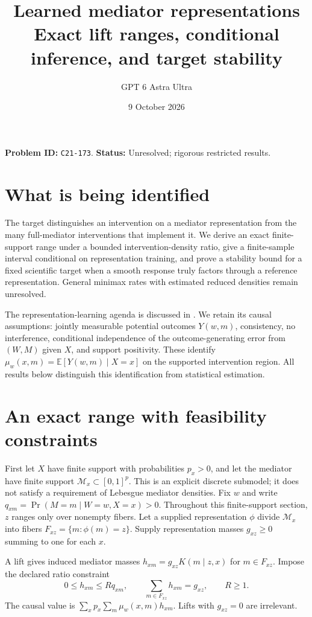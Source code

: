 \documentclass[11pt]{article}
\title{Learned mediator representations\\\large Exact lift ranges, conditional inference, and target stability}
\author{GPT 6 Astra Ultra}
\date{9 October 2026}
\theoremstyle{remark}
\newcommand{\E}{\mathbb E}
\begin{document}
\maketitle
\noindent\textbf{Problem ID:} \texttt{C21-173}. \textbf{Status:} Unresolved; rigorous restricted results.

\section{What is being identified}
The target distinguishes an intervention on a mediator representation from the many full-mediator interventions that implement it. We derive an exact finite-support range under a bounded intervention-density ratio, give a finite-sample interval conditional on representation training, and prove a stability bound for a fixed scientific target when a smooth response truly factors through a reference representation. General minimax rates with estimated reduced densities remain unresolved.

The representation-learning agenda is discussed in \cite[Section 3.4.3]{challenge}. We retain its causal assumptions: jointly measurable potential outcomes $Y(w,m)$, consistency, no interference, conditional independence of the outcome-generating error from $(W,M)$ given $X$, and support positivity. These identify $\mu_w(x,m)=\E[Y(w,m)\mid X=x]$ on the supported intervention region. All results below distinguish this identification from statistical estimation.

\section{An exact range with feasibility constraints}
First let $X$ have finite support with probabilities $p_x>0$, and let the mediator have finite support $\mathcal M_x\subset[0,1]^p$. This is an explicit discrete submodel; it does not satisfy a requirement of Lebesgue mediator densities. Fix $w$ and write
$q_{xm}=\Pr(M=m\mid W=w,X=x)>0$. Throughout this finite-support section, $z$ ranges only over nonempty fibers. Let a supplied representation $\phi$ divide $\mathcal M_x$ into fibers $F_{xz}=\{m:\phi(m)=z\}$. Supply representation masses $g_{xz}\geq0$ summing to one for each $x$.

A lift gives induced mediator masses $h_{xm}=g_{xz}K(m\mid z,x)$ for $m\in F_{xz}$. Impose the declared ratio constraint
\[
 0\leq h_{xm}\leq Rq_{xm},\qquad
 \sum_{m\in F_{xz}}h_{xm}=g_{xz},\qquad R\geq1.\tag{1}
\]
The causal value is $\sum_xp_x\sum_m\mu_w(x,m)h_{xm}$. Lifts with $g_{xz}=0$ are irrelevant.
\end{document}
